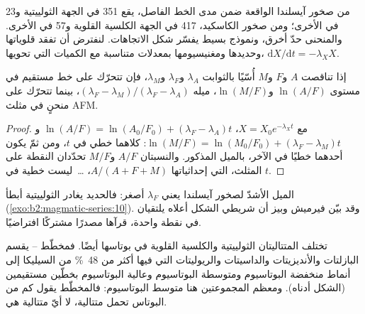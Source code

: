من صخور آيسلندا الواقعة ضمن مدى الخط الفاصل، يقع 351 في
الجهة الثولييتية و23 في الأخرى؛ ومن صخور الكاسكيد، 417 في الجهة الكلسية القلوية
و57 في الأخرى. والمنحنى حدّ أخرق، ونموذج بسيط يفسّر
شكل الاتجاهات. لنفترض أن  تفقد قلوياتها وحديدها ومغنيسيومها
بمعدلات متناسبة مع الكميات التي تحويها، $\mathrm dX/\mathrm dt = -\lambda_X X$.

\begin{proposition}\label{prop:b2:magmatic-series:logratio}
إذا تناقصت $A$ و$F$ و$M$ أُسّيًا بالثوابت $\lambda_A$ و$\lambda_F$
و$\lambda_M$، فإن  تتحرّك على خط مستقيم في مستوى $\ln(A/F)$
و$\ln(M/F)$، ميله $(\lambda_F - \lambda_M)/(\lambda_F - \lambda_A)$، بينما تتحرّك
على منحنٍ في مثلث AFM.
\end{proposition}

\begin{proof}
مع $X = X_0 e^{-\lambda_X t}$، $\ln(A/F) = \ln(A_0/F_0) + (\lambda_F - \lambda_A)t$
و$\ln(M/F) = \ln(M_0/F_0) + (\lambda_F - \lambda_M)t$: كلاهما خطي في $t$، ومن ثمّ يكون
أحدهما خطيًا في الآخر، بالميل المذكور. والنسبتان $A/F$ و$M/F$ تحدّدان
النقطة على المثلث، التي إحداثياتها $A/(A + F + M)$، \dots\ ليست خطية في $t$.
\end{proof}

الميل الأشدّ لصخور آيسلندا يعني $\lambda_F$ أصغر: فالحديد يغادر
 الثولييتية أبطأ (\cref{exo:b2:magmatic-series:10}). وقد بيّن فيرميش وبيز أن
شريطي الشكل أعلاه يلتقيان في نقطة واحدة، قرآها مصدرًا مشتركًا
افتراضيًا.

تختلف المتتاليتان الثولييتية والكلسية القلوية في بوتاسها أيضًا. فمخطّط
-- يقسم البازلتات والأنديزيتات والداسيتات والريوليتات التي فيها
أكثر من \qty{48}{\percent} من السيليكا إلى أنماط منخفضة البوتاسيوم ومتوسطة البوتاسيوم وعالية البوتاسيوم بخطّين
مستقيمين (الشكل أدناه). ومعظم المجموعتين هنا متوسط البوتاسيوم: فالمخطّط
يقول كم من البوتاس تحمل متتالية، لا أيّ متتالية هي.

